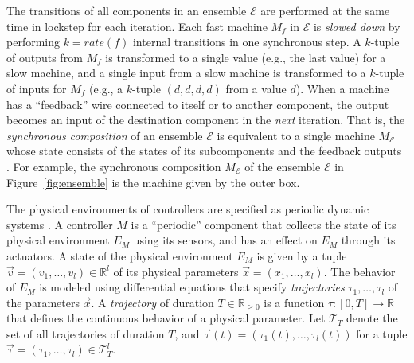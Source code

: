 \documentclass{sig-alternate}
\begin{document}
The transitions of all components in an ensemble $\mathcal{E}$
are performed at the same time in lockstep for each iteration.
Each fast machine $M_f$ in $\mathcal{E}$ is \emph{slowed down} 
by performing $k = \mathit{rate}(f)$ internal transitions  in one synchronous step.
A $k$-tuple of outputs from $M_f$  is transformed to 
a single value (e.g., the last value) %
for a slow machine,
and a single input  from a slow machine
is transformed to a $k$-tuple of inputs for $M_f$
(e.g., a $k$-tuple $(d, d, d, d)$ from a value $d$).
%
When a machine has a ``feedback'' wire connected to itself or to another component,
the output becomes an input of the destination component in the \emph{next} iteration.
That is,
the \emph{synchronous composition}  of an ensemble $\mathcal{E}$
is equivalent to a single machine $M_\mathcal{E}$
whose state consists of the states of its subcomponents
and the feedback outputs \cite{mr-pals-journal,pals-tcs}.
For example, 
the synchronous composition $M_\mathcal{E}$ 
of the ensemble $\mathcal{E}$ in Figure~\ref{fig:ensemble} 
is the machine given by the outer box. 



The physical environments of controllers
are specified as periodic dynamic systems \cite{ftscs-journal}.
%
A controller $M$ is a ``periodic'' component 
that collects the state of  its physical environment  $E_M$ using its sensors,
 and has an effect on $E_M$ through its  actuators.
A state of the physical environment $E_M$ 
is given by a tuple $\vec{v} = (v_1,\ldots,v_l) \in \mathbb{R}^l$ 
of its physical parameters $\vec{x} = (x_1, \ldots,x_l)$.
The behavior of $E_M$
is modeled using differential equations that specify \emph{trajectories} 
$\tau_1, \ldots, \tau_l$ of the parameters $\vec{x}$.
A \emph{trajectory} \cite{lynch2003hybrid} of duration $T \in \mathbb{R}_{\geq 0}$ is a function $\tau : [0,T] \rightarrow \mathbb{R}$
that defines the 
continuous behavior of a physical parameter.
%
Let  $\mathcal{T}_T$ denote
the set of all trajectories of 
duration $T$,
and $\vec{\tau}(t) = (\tau_1(t),\ldots,\tau_l(t))$ for a tuple %
$\vec{\tau} = (\tau_1,\ldots,\tau_l) \in \mathcal{T}_T^l$.
\end{document}
